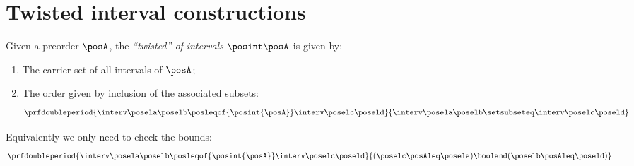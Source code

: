 
\section{Twisted interval constructions}



\begin{marginfigure}
    \centering
    \caption{
        $\interv \posela \poselb
            \posleqof{\posint{\posA}}
            \interv \poselc \poseld$
    }
\end{marginfigure}


\begin{definition}
    \label{def:twisted-poset-of-intervals}
    Given a preorder $\posA$, the \emph{``twisted''  of intervals} $\posint\posA$ is given by:

    \constit
    \begin{enumerate}
        \item The carrier set of all intervals of $\posA$;
        \item The order given by inclusion of the associated subsets:
              \begin{equation}\label{eq:twisted-1}
                  \prfdoubleperiod{
                      \interv \posela \poselb
                      \posleqof{\posint{\posA}}
                      \interv \poselc \poseld
                  }{
                      \interv \posela \poselb
                      \setsubseteq
                      \interv \poselc \poseld
                  }
              \end{equation}
    \end{enumerate}
    Equivalently we only need to check the bounds:
    \begin{equation}\label{eq:twisted-2}
        \prfdoubleperiod{
            \interv \posela \poselb
            \posleqof{\posint{\posA}}
            \interv \poselc \poseld
        }{
            (\poselc \posAleq \posela ) \booland (\poselb \posAleq \poseld)
        }
    \end{equation}
\end{definition}

